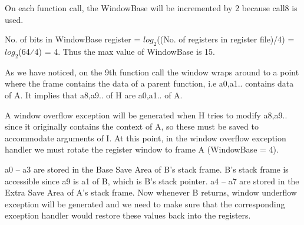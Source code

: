 On each function call, the WindowBase will be incremented by 2 because call8 is used.

No. of bits in WindowBase register = $log_{2}$((No. of registers in register file)/4) = $log_{2}$(64⁄4) = 4. Thus the max value of WindowBase is 15.

As we have noticed, on the 9th function call the window wraps around to a point where the frame contains the data of a parent function, i.e a0,a1.. contains data of A. It implies that a8,a9.. of H are a0,a1.. of A.

A window overflow exception will be generated when H tries to modify a8,a9.. since it originally contains the context of A, so these must be saved to accommodate arguments of I. At this point, in the window overflow exception handler we must rotate the register window to frame A (WindowBase = 4).

a0 -- a3 are stored in the Base Save Area of B’s stack frame. B’s stack frame is accessible since a9 is a1 of B, which is B’s stack pointer.
a4 -- a7 are stored in the Extra Save Area of A’s stack frame.
Now whenever B returns, window underflow exception will be generated and we need to make sure that the corresponding exception handler would restore these values back into the registers.

